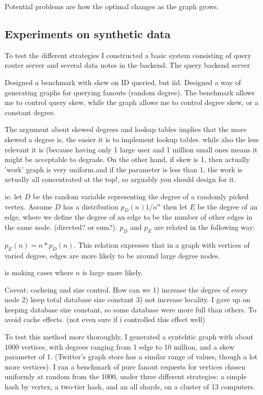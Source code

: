 Potential problems are how the optimal changes as the graph grows.


\subsection{Experiments on synthetic data}
To test the different strategies I constructed a basic system consisting of query router server and  several data notes in the backend.  The query backend server 

Designed a benchmark with skew on ID queried, but iid. Designed a way of generating graphs for querying fanouts (random degree). The benchmark allows me to control 
query skew, while the graph allows me to control degree skew, or a constant degree.

The argument about skewed degrees and lookup tables implies that the more skewed a degree is, the easier it is to implement lookup tables. while also the less relevant it is
(because having only 1 large user and 1 million small ones means it might be acceptable to degrade. On the other hand, if skew is 1, then actually 'work' graph is very uniform.and if the parameter is less than 1, the work is actually all concentrated at the top!, so arguably you should design for it.

ie. let  \(D\) be the random variable representing the degree of a randomly picked vertex. Assume \(D\) has a distribution \(p_D(n) 1/n^\alpha \) then let \(E \) be the degree of an edge, where we define the degree of an edge to be the number of other edges in the same node. (directed? or sum?). \(p_D \) and  \(p_E \) are related in the following way:

\( p_E(n) = n*p_D(n)\). This relation expresses that in a graph with vertices of varied degree, edges are more likely to be around large degree nodes. 

 is making cases where \(n \) is large more likely. 

Caveat: cacheing and size control. How can we 1) increase the degree of every node 2) keep total database size constant 3) not increase locality.
I gave up on keeping database size constant, so some database were more full than others. To avoid cache effects. (not even sure if i controlled this effect well)


To test this method more thoroughly, I generated a syntehtic graph with about 1000 vertices,  with degrees ranging from 1 edge to 10 million, and a skew parameter of 1. (Twitter's graph store has a similar range of values, though a lot more vertices).  I ran a benchmark of pure fanout requests for vertices chosen uniformly at random from the 1000, under three different strategies: a simple hash by vertex, a two-tier hash, and an all shards, on a cluster of 13 computers.

